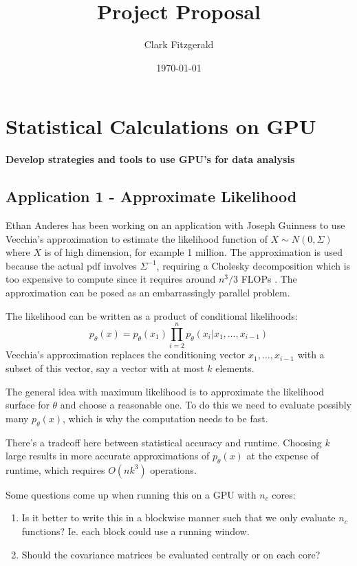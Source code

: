 \documentclass[12pt]{article}
\begin{document}
\title{Project Proposal}
\date{\today}
\author{Clark Fitzgerald}
\maketitle

\begin{abstract}

\end{abstract}

\section{Statistical Calculations on GPU}

\textbf{Develop strategies and tools to use GPU's for data analysis}

\subsection{Application 1 - Approximate Likelihood}

Ethan Anderes has been working on an application with Joseph Guinness to
use Vecchia's approximation to estimate the likelihood function of $X \sim
N(0, \Sigma)$ where $X$ is of high dimension, for example 1 million. The
approximation is used because the actual pdf involves $\Sigma^{-1}$,
requiring a Cholesky decomposition which is too expensive to compute since
it requires around $n^3 / 3$ FLOPs \cite{guinness2016permutation}.  The approximation can be
posed as an embarrassingly parallel problem.

The likelihood can be written as a product of conditional likelihoods:
\[
    p_\theta(x) = p_\theta(x_1) \prod_{i = 2}^n
        p_\theta(x_i | x_1, \dots, x_{i-1})
\]
Vecchia's approximation replaces the conditioning vector $x_1, \dots,
x_{i-1}$ with a subset of this vector, say a vector with at most $k$
elements.

The general idea with maximum likelihood is to approximate the likelihood
surface for $\theta$ and choose a reasonable one. To do this we need
to evaluate possibly many $p_\theta(x)$, which is why the computation needs
to be fast.

There's a tradeoff here between statistical accuracy and runtime.
Choosing $k$ large results in more accurate approximations of $p_\theta(x)$
at the expense of runtime, which requires $O(nk^3)$ operations.

Some questions come up when running this on a GPU with $n_c$ cores:
\begin{enumerate}
    \item Is it better to write this in a blockwise manner such that we only
        evaluate $n_c$ functions? Ie. each block could use a running
        window.
    \item Should the covariance matrices be evaluated centrally or on each
        core?
\end{enumerate}
\end{document}
